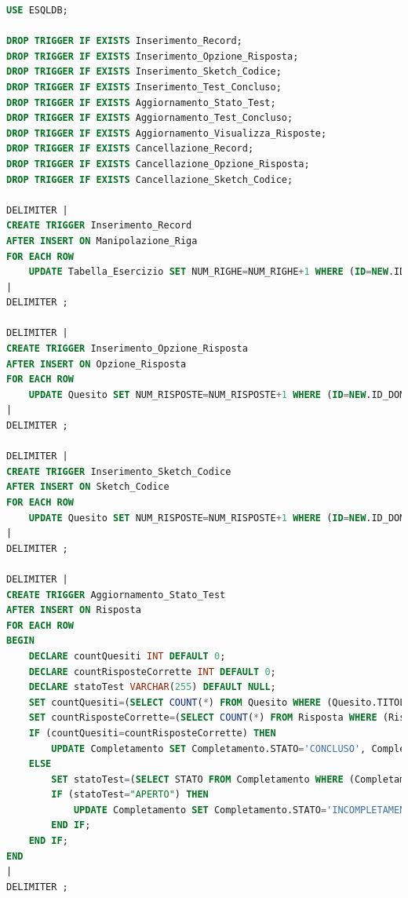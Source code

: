 \documentclass{article}
\begin{document}
\begin{lstlisting}[language=SQL, title=Codice SQL completo dei trigger dello schema della basi di dati.]
USE ESQLDB;

DROP TRIGGER IF EXISTS Inserimento_Record;
DROP TRIGGER IF EXISTS Inserimento_Opzione_Risposta;
DROP TRIGGER IF EXISTS Inserimento_Sketch_Codice;
DROP TRIGGER IF EXISTS Inserimento_Test_Concluso;
DROP TRIGGER IF EXISTS Aggiornamento_Stato_Test;
DROP TRIGGER IF EXISTS Aggiornamento_Test_Concluso;
DROP TRIGGER IF EXISTS Aggiornamento_Visualizza_Risposte;
DROP TRIGGER IF EXISTS Cancellazione_Record;
DROP TRIGGER IF EXISTS Cancellazione_Opzione_Risposta;
DROP TRIGGER IF EXISTS Cancellazione_Sketch_Codice;

DELIMITER |
CREATE TRIGGER Inserimento_Record
AFTER INSERT ON Manipolazione_Riga
FOR EACH ROW
    UPDATE Tabella_Esercizio SET NUM_RIGHE=NUM_RIGHE+1 WHERE (ID=NEW.ID_TABELLA);
|
DELIMITER ;

DELIMITER |
CREATE TRIGGER Inserimento_Opzione_Risposta
AFTER INSERT ON Opzione_Risposta
FOR EACH ROW
    UPDATE Quesito SET NUM_RISPOSTE=NUM_RISPOSTE+1 WHERE (ID=NEW.ID_DOMANDA_CHIUSA);
|
DELIMITER ;

DELIMITER |
CREATE TRIGGER Inserimento_Sketch_Codice
AFTER INSERT ON Sketch_Codice
FOR EACH ROW
    UPDATE Quesito SET NUM_RISPOSTE=NUM_RISPOSTE+1 WHERE (ID=NEW.ID_DOMANDA_CODICE);
|
DELIMITER ;

DELIMITER |
CREATE TRIGGER Aggiornamento_Stato_Test
AFTER INSERT ON Risposta
FOR EACH ROW
BEGIN
    DECLARE countQuesiti INT DEFAULT 0;
    DECLARE countRisposteCorrette INT DEFAULT 0;
    DECLARE statoTest VARCHAR(255) DEFAULT NULL;
    SET countQuesiti=(SELECT COUNT(*) FROM Quesito WHERE (Quesito.TITOLO_TEST=NEW.TITOLO_TEST));
    SET countRisposteCorrette=(SELECT COUNT(*) FROM Risposta WHERE (Risposta.TITOLO_TEST=NEW.TITOLO_TEST) AND (Risposta.EMAIL_STUDENTE=NEW.EMAIL_STUDENTE) AND (Risposta.ESITO=1));
    IF (countQuesiti=countRisposteCorrette) THEN 
        UPDATE Completamento SET Completamento.STATO='CONCLUSO', Completamento.DATA_ULTIMARISPOSTA=NOW() WHERE (Completamento.TITOLO_TEST=NEW.TITOLO_TEST) AND (Completamento.EMAIL_STUDENTE=NEW.EMAIL_STUDENTE);
    ELSE 
        SET statoTest=(SELECT STATO FROM Completamento WHERE (Completamento.TITOLO_TEST=NEW.TITOLO_TEST));
        IF (statoTest="APERTO") THEN
            UPDATE Completamento SET Completamento.STATO='INCOMPLETAMENTO', Completamento.DATA_PRIMARISPOSTA=NOW() WHERE (Completamento.TITOLO_TEST=NEW.TITOLO_TEST) AND (Completamento.EMAIL_STUDENTE=NEW.EMAIL_STUDENTE);
        END IF;
    END IF; 
END
|
DELIMITER ;


\end{lstlisting}
\end{document}
